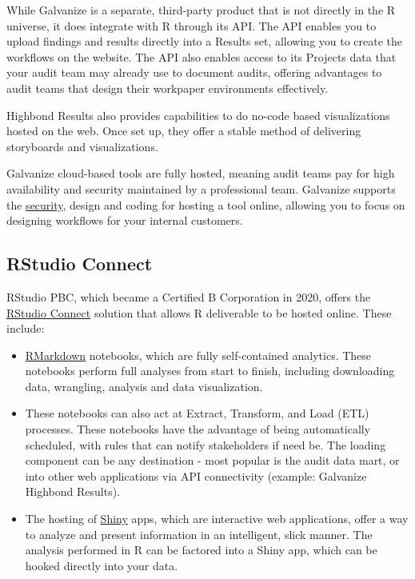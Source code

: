 \documentclass[
]{book}
\providecommand{\tightlist}{%
  \setlength{\itemsep}{0pt}\setlength{\parskip}{0pt}}
\begin{document}
While Galvanize is a separate, third-party product that is not directly in the R universe, it does integrate with R through its API. The API enables you to upload findings and results directly into a Results set, allowing you to create the workflows on the website. The API also enables access to its Projects data that your audit team may already use to document audits, offering advantages to audit teams that design their workpaper environments effectively.

Highbond Results also provides capabilities to do no-code based visualizations hosted on the web. Once set up, they offer a stable method of delivering storyboards and visualizations.

Galvanize cloud-based tools are fully hosted, meaning audit teams pay for high availability and security maintained by a professional team. Galvanize supports the \href{https://www.wegalvanize.com/trust/}{security}, design and coding for hosting a tool online, allowing you to focus on designing workflows for your internal customers.

\hypertarget{rstudio-connect}{%
\subsection{RStudio Connect}\label{rstudio-connect}}

RStudio PBC, which became a Certified B Corporation in 2020, offers the \href{https://rstudio.com/products/connect/}{RStudio Connect} solution that allows R deliverable to be hosted online. These include:

\begin{itemize}
\tightlist
\item
  \href{https://rmarkdown.rstudio.com}{RMarkdown} notebooks, which are fully self-contained analytics. These notebooks perform full analyses from start to finish, including downloading data, wrangling, analysis and data visualization.
\item
  These notebooks can also act at Extract, Transform, and Load (ETL) processes. These notebooks have the advantage of being automatically scheduled, with rules that can notify stakeholders if need be. The loading component can be any destination - most popular is the audit data mart, or into other web applications via API connectivity (example: Galvanize Highbond Results).
\item
  The hosting of \href{https://shiny.rstudio.com}{Shiny} apps, which are interactive web applications, offer a way to analyze and present information in an intelligent, slick manner. The analysis performed in R can be factored into a Shiny app, which can be hooked directly into your data.
\end{itemize}
\end{document}
